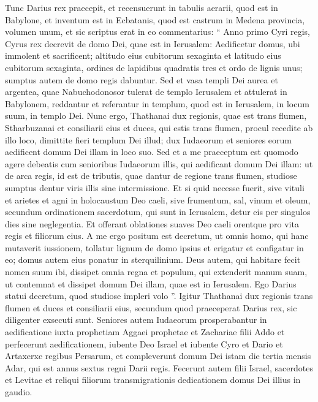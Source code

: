 \begin{biblechapter}
\begin{biblechapter}
\begin{biblechapter}
\begin{biblechapter}
\begin{biblechapter}
\begin{biblechapter}
\verse Tunc Darius rex praecepit, et recensuerunt in tabulis aerarii, quod est in Babylone, 
\verse et inventum est in Ecbatanis, quod est castrum in Medena provincia, volumen unum, et sic scriptus erat in eo commentarius:
 \verse “ Anno primo Cyri regis, Cyrus rex decrevit de domo Dei, quae est in Ierusalem: Aedificetur domus, ubi immolent et sacrificent; altitudo eius cubitorum sexaginta et latitudo eius cubitorum sexaginta, 
\verse ordines de lapidibus quadratis tres et ordo de lignis unus; sumptus autem de domo regis dabuntur. 
\verse Sed et vasa templi Dei aurea et argentea, quae Nabuchodonosor tulerat de templo Ierusalem et attulerat in Babylonem, reddantur et referantur in templum, quod est in Ierusalem, in locum suum, in templo Dei.
 \verse Nunc ergo, Thathanai dux regionis, quae est trans flumen, Stharbuzanai et consiliarii eius et duces, qui estis trans flumen, procul recedite ab illo loco, 
\verse dimittite fieri templum Dei illud; dux Iudaeorum et seniores eorum aedificent domum Dei illam in loco suo. 
\verse Sed et a me praeceptum est quomodo agere debeatis cum senioribus Iudaeorum illis, qui aedificant domum Dei illam: ut de arca regis, id est de tributis, quae dantur de regione trans flumen, studiose sumptus dentur viris illis sine intermissione. 
\verse Et si quid necesse fuerit, sive vituli et arietes et agni in holocaustum Deo caeli, sive frumentum, sal, vinum et oleum, secundum ordinationem sacerdotum, qui sunt in Ierusalem, detur eis per singulos dies sine neglegentia. 
\verse Et offerant oblationes suaves Deo caeli orentque pro vita regis et filiorum eius. 
\verse A me ergo positum est decretum, ut omnis homo, qui hanc mutaverit iussionem, tollatur lignum de domo ipsius et erigatur et configatur in eo; domus autem eius ponatur in sterquilinium. 
\verse Deus autem, qui habitare fecit nomen suum ibi, dissipet omnia regna et populum, qui extenderit manum suam, ut contemnat et dissipet domum Dei illam, quae est in Ierusalem. Ego Darius statui decretum, quod studiose impleri volo ”.
 \verse Igitur Thathanai dux regionis trans flumen et duces et consiliarii eius, secundum quod praeceperat Darius rex, sic diligenter exsecuti sunt. 
\verse Seniores autem Iudaeorum prosperabantur in aedificatione iuxta prophetiam Aggaei prophetae et Zachariae filii Addo et perfecerunt aedificationem, iubente Deo Israel et iubente Cyro et Dario et Artaxerxe regibus Persarum, 
\verse et compleverunt domum Dei istam die tertia mensis Adar, qui est annus sextus regni Darii regis.
 \verse Fecerunt autem filii Israel, sacerdotes et Levitae et reliqui filiorum transmigrationis dedicationem domus Dei illius in gaudio. 

\end{biblechapter}
\end{biblechapter}
\end{biblechapter}
\end{biblechapter}
\end{biblechapter}
\end{biblechapter}
